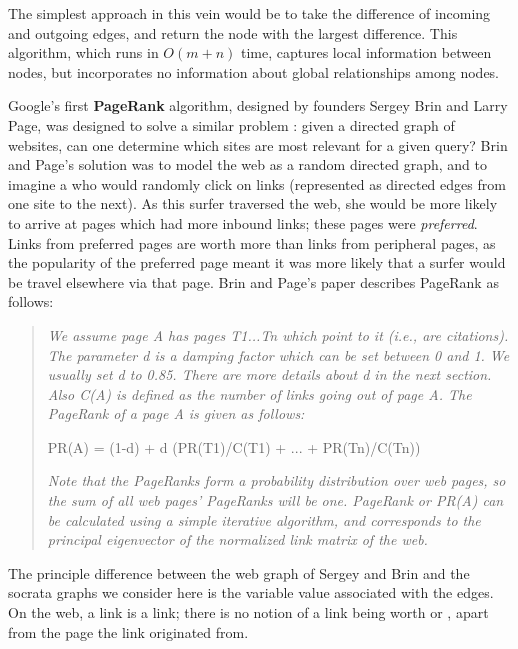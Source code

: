 \documentclass[12pt]{book}
\begin{document}
The simplest approach in this vein would be to take the difference of incoming and outgoing edges, and return the node with the largest difference.
This algorithm, which runs in $O(m + n)$ time, captures local information between nodes, but incorporates no information about global relationships among nodes.

\bigskip

Google's first \textbf{PageRank} algorithm, designed by founders Sergey Brin and Larry Page, was designed to solve a similar problem \cite{brin}: given a directed graph of websites, can one determine which sites are most relevant for a given query?
Brin and Page's solution was to model the web as a random directed graph, and to imagine a  who would randomly click on links (represented as directed edges from one site to the next).
As this surfer traversed the web, she would be more likely to arrive at pages which had more inbound links; these pages were \textit{preferred}.
Links from preferred pages are worth more than links from peripheral pages, as the popularity of the preferred page meant it was more likely that a surfer would be travel elsewhere via that page.
Brin and Page's paper describes PageRank as follows:

\begin{quotation}
	\textit{We assume page A has pages T1...Tn which point to it (i.e., are citations).
	The parameter d is a damping factor which can be set between 0 and 1.
	We usually set d to 0.85.
	There are more details about d in the next section.
	Also C(A) is defined as the number of links going out of page A.
	The PageRank of a page A is given as follows:}
	
	\bigskip
		
	PR(A) = (1-d) + d (PR(T1)/C(T1) + ... + PR(Tn)/C(Tn))
	
	\bigskip
	
	\textit{Note that the PageRanks form a probability distribution over web pages, so the sum of all web pages’ PageRanks will be one.
	PageRank or PR(A) can be calculated using a simple iterative algorithm, and corresponds to the principal eigenvector of the normalized link matrix of the web.}
\end{quotation}

The principle difference between the web graph of Sergey and Brin and the socrata graphs we consider here is the variable value associated with the edges.
On the web, a link is a link; there is no notion of a link being worth  or , apart from the page the link originated from.
\end{document}
